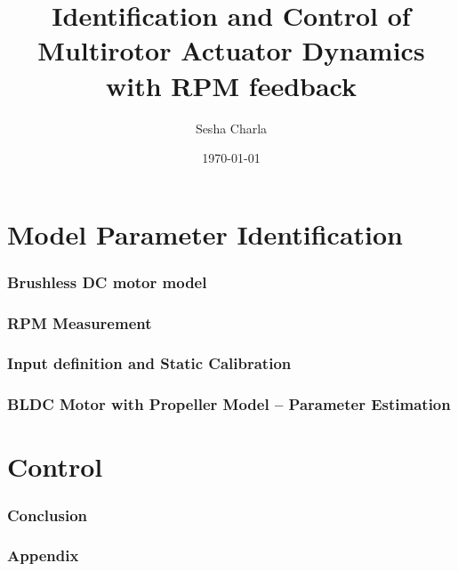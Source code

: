 \documentclass[letterpaper, 11pt]{article}
\title{Identification and Control of Multirotor Actuator Dynamics with RPM feedback}
\author{Sesha Charla}
\date{\today}
\begin{document}
\maketitle
\tableofcontents
\newpage
\part{Model Parameter Identification}
\section{Brushless DC motor model}



\newpage
\section{RPM Measurement}

\newpage
\section{Input definition and Static Calibration}


\newpage
\section{BLDC Motor with Propeller Model -- Parameter Estimation}



\newpage
\part{Control}

\newpage

\newpage
\section{Conclusion}
\newpage
\section{Appendix}

\newpage


\end{document}
